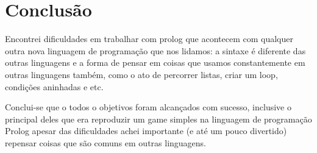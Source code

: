 \chapter{Conclusão}
\label{sec-analise}

\par Encontrei dificuldades em trabalhar com prolog que acontecem com qualquer outra nova linguagem de programação que nos lidamos: a sintaxe é diferente das outras linguagens e a forma de pensar em coisas que usamos constantemente em outras linguagens também, como o ato de percorrer listas, criar um loop, condições aninhadas e etc. 
\par Conclui-se que o todos o objetivos foram alcançados com sucesso, inclusive o principal deles que era reproduzir um game simples na linguagem de programação Prolog apesar das dificuldades achei importante (e até um pouco divertido) repensar coisas que são comuns em outras linguagens.